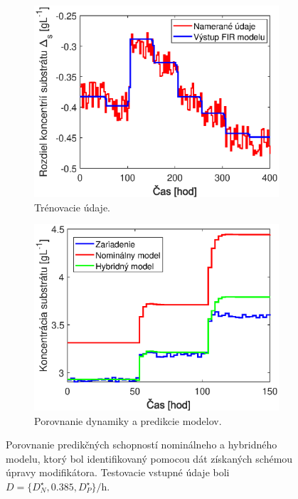 \begin{figure}
	\centering
	\begin{subfigure}[b]{0.49\textwidth}
		\centering
		\includegraphics[width=\linewidth]{images/hybrid_dynamics_data}
		\caption{Trénovacie údaje. \newline}
		\label{fig:hybrid_dynamics_data}
	\end{subfigure}
	\hfill
	\begin{subfigure}[b]{0.49\textwidth}
		\centering
		\includegraphics[width=\linewidth]{images/hybrid_dynamics_comparison}
		\caption{Porovnanie dynamiky a predikcie modelov.}
		\label{fig:hybrid_dynamics_comparison}
	\end{subfigure}
	\caption{Porovnanie predikčných schopností nominálneho a hybridného modelu, ktorý bol identifikovaný pomocou dát získaných schémou úpravy modifikátora. Testovacie vstupné údaje boli $ D = \lbrace D_{N}^{\star}, 0.385, D_{P}^{\star} \rbrace \si{\per\hour} $.}
	\label{fig:hybrid_dynamics_and_prediction}
\end{figure}

